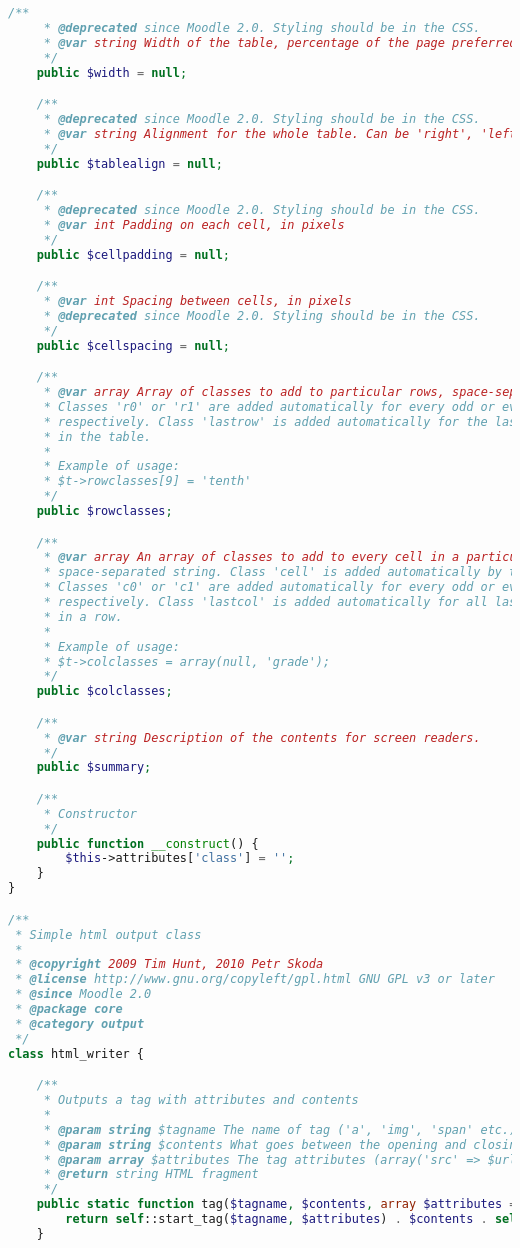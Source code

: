 \begin{lstlisting}[language=PHP]
    /**
     * @deprecated since Moodle 2.0. Styling should be in the CSS.
     * @var string Width of the table, percentage of the page preferred.
     */
    public $width = null;

    /**
     * @deprecated since Moodle 2.0. Styling should be in the CSS.
     * @var string Alignment for the whole table. Can be 'right', 'left' or 'center' (default).
     */
    public $tablealign = null;

    /**
     * @deprecated since Moodle 2.0. Styling should be in the CSS.
     * @var int Padding on each cell, in pixels
     */
    public $cellpadding = null;

    /**
     * @var int Spacing between cells, in pixels
     * @deprecated since Moodle 2.0. Styling should be in the CSS.
     */
    public $cellspacing = null;

    /**
     * @var array Array of classes to add to particular rows, space-separated string.
     * Classes 'r0' or 'r1' are added automatically for every odd or even row,
     * respectively. Class 'lastrow' is added automatically for the last row
     * in the table.
     *
     * Example of usage:
     * $t->rowclasses[9] = 'tenth'
     */
    public $rowclasses;

    /**
     * @var array An array of classes to add to every cell in a particular column,
     * space-separated string. Class 'cell' is added automatically by the renderer.
     * Classes 'c0' or 'c1' are added automatically for every odd or even column,
     * respectively. Class 'lastcol' is added automatically for all last cells
     * in a row.
     *
     * Example of usage:
     * $t->colclasses = array(null, 'grade');
     */
    public $colclasses;

    /**
     * @var string Description of the contents for screen readers.
     */
    public $summary;

    /**
     * Constructor
     */
    public function __construct() {
        $this->attributes['class'] = '';
    }
}

/**
 * Simple html output class
 *
 * @copyright 2009 Tim Hunt, 2010 Petr Skoda
 * @license http://www.gnu.org/copyleft/gpl.html GNU GPL v3 or later
 * @since Moodle 2.0
 * @package core
 * @category output
 */
class html_writer {

    /**
     * Outputs a tag with attributes and contents
     *
     * @param string $tagname The name of tag ('a', 'img', 'span' etc.)
     * @param string $contents What goes between the opening and closing tags
     * @param array $attributes The tag attributes (array('src' => $url, 'class' => 'class1') etc.)
     * @return string HTML fragment
     */
    public static function tag($tagname, $contents, array $attributes = null) {
        return self::start_tag($tagname, $attributes) . $contents . self::end_tag($tagname);
    }


\end{lstlisting}
